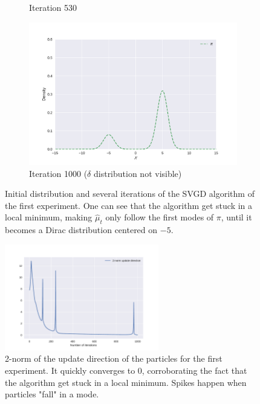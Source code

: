 \documentclass{article}
\begin{document}
\begin{figure}[H]
\begin{subfigure}{0.48\textwidth}
    \caption{Iteration 530}
  \end{subfigure}
  \begin{subfigure}{0.48\textwidth}
    \centering
    \includegraphics[width=\textwidth]{exp1-1000.pdf}
    \caption{Iteration 1000 ($\delta$ distribution not visible)}
  \end{subfigure}

  \caption{Initial distribution and several iterations of the SVGD algorithm
    of the first experiment. One can see that the
    algorithm get stuck in a local minimum, making $\hat{\mu}_t$
    only follow the first modes of $\pi$, until it becomes a Dirac distribution
    centered on $-5$.}
  \label{fig:exp1}
\end{figure}

\begin{figure}[H]
  \centering
  \includegraphics[width=0.6\textwidth]{norm_direction.pdf}
  \caption{2-norm of the update direction of the particles
    for the first experiment. It quickly converges to $0$, corroborating the fact that
    the algorithm get stuck in a local minimum. Spikes happen when particles "fall" in a mode.}
  \label{fig:norm-update}
\end{figure}
\end{document}
